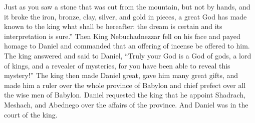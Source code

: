 \begin{enumerate}[align=center]
     Just as you saw a stone that was cut from the mountain, but not by hands, and it broke the iron, bronze, clay, silver, and gold in pieces, a great God has made known to the king what shall be hereafter: the dream is certain and its interpretation is sure.''%
     Then King Nebuchadnezzar fell on his face and payed homage to Daniel and commanded that an offering of incense be offered to him.%
     The king answered and said to Daniel, ``Truly your God is a God of gods, a lord of kings, and a revealer of mysteries, for you have been able to reveal this mystery!''%
     The king then made Daniel great, gave him many great gifts, and made him a ruler over the whole province of Babylon and chief prefect over all the wise men of Babylon.%
     Daniel requested the king that he appoint Shadrach, Meshach, and Abednego over the affairs of the province. And Daniel was in the court of the king.%
\end{enumerate}
